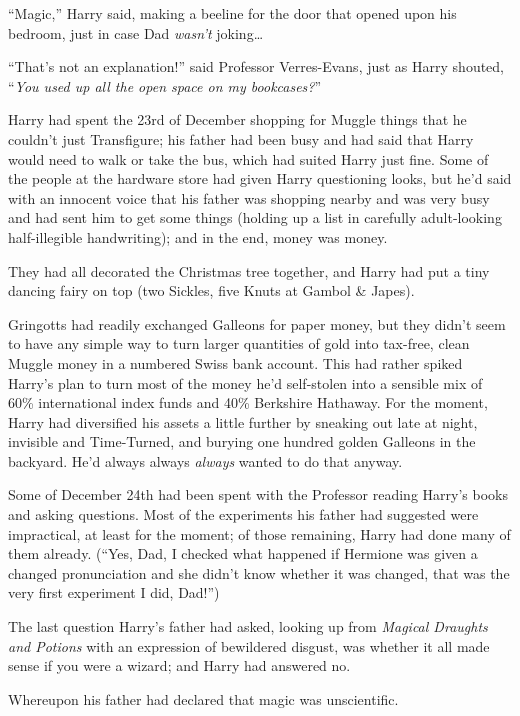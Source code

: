 “Magic,” Harry said, making a beeline for the door that opened upon his bedroom, just in case Dad \emph{wasn’t} joking…

“That’s not an explanation!” said Professor Verres-Evans, just as Harry shouted, “\emph{You used up all the open space on my bookcases?}”

\later

Harry had spent the 23rd of December shopping for Muggle things that he couldn’t just Transfigure; his father had been busy and had said that Harry would need to walk or take the bus, which had suited Harry just fine. Some of the people at the hardware store had given Harry questioning looks, but he’d said with an innocent voice that his father was shopping nearby and was very busy and had sent him to get some things (holding up a list in carefully adult-looking half-illegible handwriting); and in the end, money was money.

They had all decorated the Christmas tree together, and Harry had put a tiny dancing fairy on top (two Sickles, five Knuts at Gambol \& Japes).

Gringotts had readily exchanged Galleons for paper money, but they didn’t seem to have any simple way to turn larger quantities of gold into tax-free, clean Muggle money in a numbered Swiss bank account. This had rather spiked Harry’s plan to turn most of the money he’d self-stolen into a sensible mix of 60\% international index funds and 40\% Berkshire Hathaway. For the moment, Harry had diversified his assets a little further by sneaking out late at night, invisible and Time-Turned, and burying one hundred golden Galleons in the backyard. He’d always always \emph{always} wanted to do that anyway.

Some of December 24th had been spent with the Professor reading Harry’s books and asking questions. Most of the experiments his father had suggested were impractical, at least for the moment; of those remaining, Harry had done many of them already. (“Yes, Dad, I checked what happened if Hermione was given a changed pronunciation and she didn’t know whether it was changed, that was the very first experiment I did, Dad!”)

The last question Harry’s father had asked, looking up from \emph{Magical Draughts and Potions} with an expression of bewildered disgust, was whether it all made sense if you were a wizard; and Harry had answered no.

Whereupon his father had declared that magic was unscientific.

